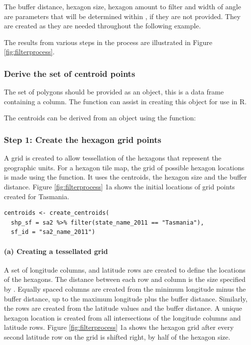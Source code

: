 The buffer distance, hexagon size, hexagon amount to filter and width of
angle are parameters that will be determined within
, if they are not provided. They are created as
they are needed throughout the following example.

The results from various steps in the process are illustrated in Figure
\ref{fig:filterprocess}.

\hypertarget{derive-the-set-of-centroid-points}{%
\subsubsection{Derive the set of centroid
points}\label{derive-the-set-of-centroid-points}}

The set of polygons should be provided as an  object, this is a
data frame containing a  column. The 
function can assist in creating this object for use in R.

The centroids can be derived from an  object using the
 function:

\hypertarget{step-1-create-the-hexagon-grid-points}{%
\subsubsection{Step 1: Create the hexagon grid
points}\label{step-1-create-the-hexagon-grid-points}}

A grid is created to allow tessellation of the hexagons that represent
the geographic units. For a hexagon tile map, the grid of possible
hexagon locations is made using the  function. It
uses the centroids, the hexagon size and the buffer distance. Figure
\ref{fig:filterprocess} 1a shows the initial locations of grid points
created for Tasmania.

\begin{verbatim}
centroids <- create_centroids(
  shp_sf = sa2 %>% filter(state_name_2011 == "Tasmania"), 
  sf_id = "sa2_name_2011")
\end{verbatim}

\hypertarget{a-creating-a-tessellated-grid}{%
\paragraph{(a) Creating a tessellated
grid}\label{a-creating-a-tessellated-grid}}

A set of longitude columns, and latitude rows are created to define the
locations of the hexagons. The distance between each row and column is
the size specified by . Equally spaced columns are
created from the minimum longitude minus the buffer distance, up to the
maximum longitude plus the buffer distance. Similarly, the rows are
created from the latitude values and the buffer distance. A unique
hexagon location is created from all intersections of the longitude
columns and latitude rows. Figure \ref{fig:filterprocess} 1a shows the
hexagon grid after every second latitude row on the grid is shifted
right, by half of the hexagon size.

